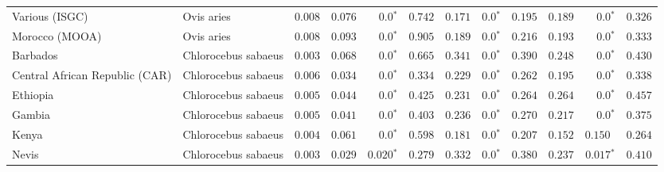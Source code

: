 \documentclass{article}
\begin{document}
\begin{table*}[!ht]
\begin{adjustbox}{width = 1\textwidth}
\begin{tabular}{||l|l|r||r|r|r||r|r|r||r|r|r||}
                Various (ISGC)                                      & Ovis aries          & $ 0.008$ & $ 0.076$ & $\bm{0.0{^*}}$    & $ 0.742$ & $ 0.171$ & $\bm{0.0{^*}}$ & $ 0.195$ & $ 0.189$ & $\bm{0.0{^*}}$ & $ 0.326$ \\
                Morocco (MOOA)                                      & Ovis aries          & $ 0.008$ & $ 0.093$ & $\bm{0.0{^*}}$    & $ 0.905$ & $ 0.189$ & $\bm{0.0{^*}}$ & $ 0.216$ & $ 0.193$ & $\bm{0.0{^*}}$ & $ 0.333$ \\
                \rowcolor{LIGHTGREY} Barbados                       & Chlorocebus sabaeus & $ 0.003$ & $ 0.068$ & $\bm{0.0{^*}}$                  & $ 0.665$                                                                     & $ 0.341$                      & $\bm{0.0{^*}}$ & $ 0.390$ & $ 0.248$ & $\bm{0.0{^*}}$ & $ 0.430$ \\
                \rowcolor{LIGHTGREY} Central African Republic (CAR) & Chlorocebus sabaeus & $ 0.006$           & $ 0.034$                      & $\bm{0.0{^*}}$ & $ 0.334$ & $ 0.229$ & $\bm{0.0{^*}}$ & $ 0.262$ & $ 0.195$ & $\bm{0.0{^*}}$ & $ 0.338$ \\
                \rowcolor{LIGHTGREY} Ethiopia                       & Chlorocebus sabaeus & $ 0.005$ & $ 0.044$ & $\bm{0.0{^*}}$                  & $ 0.425$                                                                     & $ 0.231$                      & $\bm{0.0{^*}}$ & $ 0.264$ & $ 0.264$ & $\bm{0.0{^*}}$ & $ 0.457$ \\
                \rowcolor{LIGHTGREY} Gambia                         & Chlorocebus sabaeus & $ 0.005$ & $ 0.041$ & $\bm{0.0{^*}}$                  & $ 0.403$                                                                     & $ 0.236$                      & $\bm{0.0{^*}}$ & $ 0.270$ & $ 0.217$ & $\bm{0.0{^*}}$ & $ 0.375$ \\
                \rowcolor{LIGHTGREY} Kenya                          & Chlorocebus sabaeus & $ 0.004$ & $ 0.061$ & $\bm{0.0{^*}}$    & $ 0.598$                                                                     & $ 0.181$                      & $\bm{0.0{^*}}$ & $ 0.207$ & $ 0.152$ & $ 0.150~~$ & $ 0.264$ \\
                \rowcolor{LIGHTGREY} Nevis                          & Chlorocebus sabaeus & $ 0.003$ & $ 0.029$ & $\bm{ 0.020{^*}}$               & $ 0.279$                                                                     & $ 0.332$                      & $\bm{0.0{^*}}$ & $ 0.380$ & $ 0.237$ & $\bm{ 0.017{^*}}$ & $ 0.410$ \\

\end{tabular}
\end{adjustbox}
\end{table*}
\end{document}
